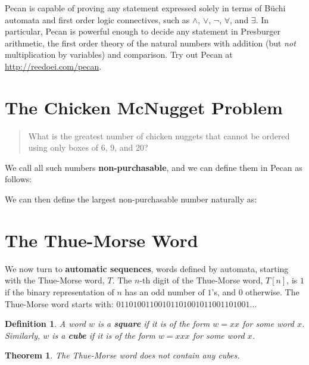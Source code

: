 \documentclass[landscape,usenames,dvipsnames]{sciposter}
\newtheorem{thm}{Theorem}%
\newtheorem*{defin}{Definition}
\begin{document}
\begin{multicols}{3}
Pecan is capable of proving any statement expressed solely in terms of B\"uchi automata and first order logic connectives, such as $\wedge$, $\vee$, $\neg$, $\forall$, and $\exists$.
In particular, Pecan is powerful enough to decide any statement in Presburger arithmetic, the first order theory of the natural numbers with addition (but \emph{not} multiplication by variables) and comparison.
Try out Pecan at \url{http://reedoei.com/pecan}.

\section*{The Chicken McNugget Problem}


\begin{quote}
    What is the greatest number of chicken nuggets that cannot be ordered using only boxes of 6, 9, and 20?
\end{quote}

We call all such numbers \textbf{non-purchasable}, and we can define them in Pecan as follows:

We can then define the largest non-purchasable number naturally as:

\columnbreak

\section*{The Thue-Morse Word}

We now turn to \textbf{automatic sequences}, words defined by automata, starting with the Thue-Morse word, $T$.
The $n$-th digit of the Thue-Morse word, $T[n]$, is $1$ if the binary representation of $n$ has an odd number of $1$'s, and $0$ otherwise.
The Thue-Morse word starts with: $01101001100101101001011001101001\ldots$

\begin{defin}
    A word $w$ is a \textbf{square} if it is of the form $w = xx$ for some word $x$.
    Similarly, $w$ is a \textbf{cube} if it is of the form $w = xxx$ for some word $x$.
\end{defin}

\begin{mdframed}[style=MyFrame]
\begin{thm}
    The Thue-Morse word does not contain any cubes.
\end{thm}
\end{mdframed}


\end{multicols}
\end{document}
